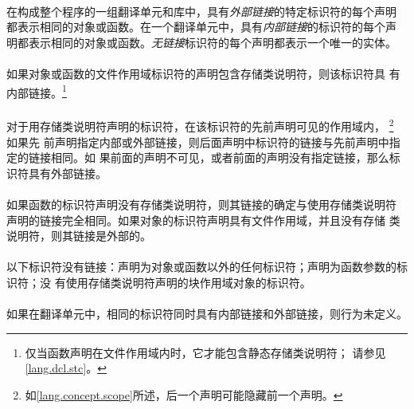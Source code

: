 {\paragraph{}
在构成整个程序的一组翻译单元和库中，具有\textit{外部链接}的特定标识符的每个声明
都表示相同的对象或函数。在一个翻译单元中，具有\textit{内部链接}的标识符的每个声
明都表示相同的对象或函数。\textit{无链接}标识符的每个声明都表示一个唯一的实体。

\paragraph{}
如果对象或函数的文件作用域标识符的声明包含存储类说明符，则该标识符具
有内部链接。\footnote{仅当函数声明在文件作用域内时，它才能包含静态存储类说明符；
请参见\ref{lang.dcl.stc}。}

\paragraph{}
对于用存储类说明符声明的标识符，在该标识符的先前声明可见的作用域内，
\footnote{如\ref{lang.concept.scope}所述，后一个声明可能隐藏前一个声明。} 如果先
前声明指定内部或外部链接，则后面声明中标识符的链接与先前声明中指定的链接相同。如
果前面的声明不可见，或者前面的声明没有指定链接，那么标识符具有外部链接。

\paragraph{}
如果函数的标识符声明没有存储类说明符，则其链接的确定与使用存储类说明符
声明的链接完全相同。如果对象的标识符声明具有文件作用域，并且没有存储
类说明符，则其链接是外部的。

\paragraph{}
以下标识符没有链接：声明为对象或函数以外的任何标识符；声明为函数参数的标识符；没
有使用存储类说明符声明的块作用域对象的标识符。

\paragraph{}
如果在翻译单元中，相同的标识符同时具有内部链接和外部链接，则行为未定义。

}

